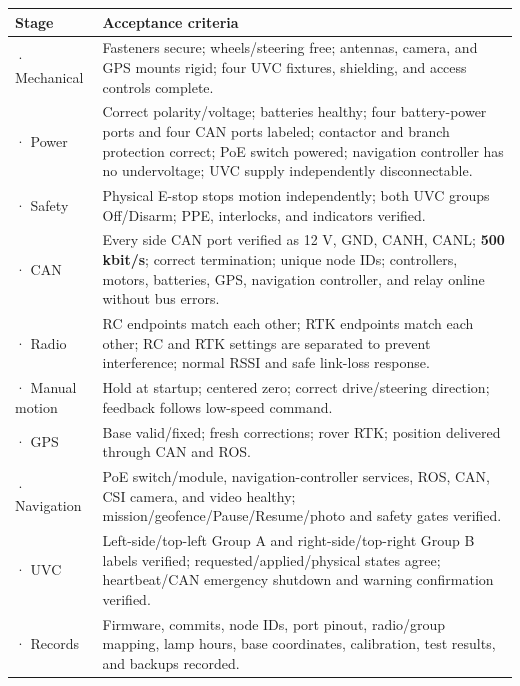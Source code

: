 \documentclass[
  10pt,
  letterpaper,
  openany]{report}
\newcounter{none} %
\begin{document}
{\def\LTcaptype{none} %
\begin{longtable}[]{@{}
  >{\raggedright\arraybackslash}p{}
  >{\raggedright\arraybackslash}p{}@{}}
\toprule\noalign{}
\begin{minipage}[b]{\linewidth}\raggedright
Stage
\end{minipage} & \begin{minipage}[b]{\linewidth}\raggedright
Acceptance criteria
\end{minipage} \\
\midrule\noalign{}
\endhead
\bottomrule\noalign{}
\endlastfoot
1 · Mechanical & Fasteners secure; wheels/steering free; antennas,
camera, and GPS mounts rigid; four UVC fixtures, shielding, and access
controls complete. \\
2 · Power & Correct polarity/voltage; batteries healthy; four
battery-power ports and four CAN ports labeled; contactor and branch
protection correct; PoE switch powered; navigation controller has no
undervoltage; UVC supply independently disconnectable. \\
3 · Safety & Physical E-stop stops motion independently; both UVC groups
Off/Disarm; PPE, interlocks, and indicators verified. \\
4 · CAN & Every side CAN port verified as 12 V, GND, CANH, CANL;
\textbf{500 kbit/s}; correct termination; unique node IDs; controllers,
motors, batteries, GPS, navigation controller, and relay online without
bus errors. \\
5 · Radio & RC endpoints match each other; RTK endpoints match each
other; RC and RTK settings are separated to prevent interference; normal
RSSI and safe link-loss response. \\
6 · Manual motion & Hold at startup; centered zero; correct
drive/steering direction; feedback follows low-speed command. \\
7 · GPS & Base valid/fixed; fresh corrections; rover RTK; position
delivered through CAN and ROS. \\
8 · Navigation & PoE switch/module, navigation-controller services, ROS,
CAN, CSI camera, and video healthy; mission/geofence/Pause/Resume/photo
and safety gates verified. \\
9 · UVC & Left-side/top-left Group A and right-side/top-right Group B
labels verified; requested/applied/physical states agree; heartbeat/CAN
emergency shutdown and warning confirmation verified. \\
10 · Records & Firmware, commits, node IDs, port pinout, radio/group
mapping, lamp hours, base coordinates, calibration, test results, and
backups recorded. \\
\end{longtable}
}
\end{document}
